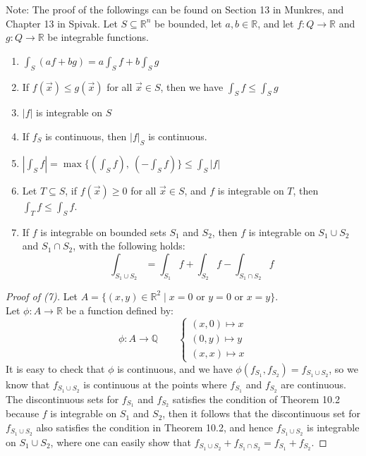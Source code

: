 \documentclass[15pt]{book}
\theoremstyle{break}
\theoremstyle{break}
\newcommand{\R}{\mathbb{R}}
\newcommand{\Q}{\mathbb{Q}}
\newcommand{\note}{\color{red}Note: \color{black}}
\begin{document}
\note The proof of the followings can be found on Section 13 in Munkres, and Chapter 13 in Spivak. Let $S\subseteq \R^n$ be bounded, let $a,b \in \R$, and let $f:Q \to \R$ and $g:Q \to \R$ be integrable functions.
\begin{enumerate}[topsep=3pt,itemsep=-1ex,partopsep=1ex,parsep=1ex]
\item $\int_S(af+bg) = a\int_S f + b\int_S g$
\item If $f(\vec{x})\leq g(\vec{x})$ for all $\vec{x}\in S$, then we have $\int_S f \leq \int_S g$
\item $|f|$ is integrable on $S$
\item If $f_S$ is continuous, then $|f|_S$ is continuous. 
\item $|\int_S f| = \max\{ (\int_S f),\ (- \int_S f)\} \leq \int_S |f|$
\item Let $T \subseteq S$, if $f(\vec{x}) \geq 0$ for all $\vec{x}\in S$,  and $f$ is integrable on $T$, then $\int_T f \leq \int_S f$. 
\item If $f$ is integrable on bounded sets $S_1$ and $S_2$, then $f$ is integrable on $S_1 \cup S_2$ and $S_1 \cap S_2$, with the following holds: $$\int_{S_1\cup S_2} = \int_{S_1} f + \int_{S_2} f - \int_{S_1\cap S_2} f$$
\end{enumerate}
\begin{proof}[Proof of (7)]
Let $A = \{ (x,y) \in \R^2 \mid x=0 \text{ or }y=0 \text{ or }x=y\}$. \\Let $\phi:A \to \R$ be a function defined by:
$$\phi:A \to \Q \qquad \begin{cases}(x,0) \mapsto x \\ (0,y) \mapsto y \\ (x,x) \mapsto x    \end{cases}$$
It is easy to check that $\phi$ is continuous, and we have $\phi(f_{S_1}, f_{S_2}) = f_{S_1\cup S_2}$, so we know that $f_{S_1\cup S_2} $ is continuous at the points where $f_{S_1}$ and $f_{S_2}$ are continuous. The discontinuous sets for $f_{S_1}$ and $f_{S_2}$ satisfies the condition of Theorem 10.2 because $f$ is integrable on $S_1$ and $S_2$, then it follows that the discontinuous set for $f_{S_1\cup S_2}$ also satisfies the condition in Theorem 10.2, and hence $f_{S_1\cup S_2}$ is integrable on $S_1 \cup S_2$, where one can easily show that $f_{S_1\cup S_2}+ f_{S_1\cap S_2} = f_{S_1} + f_{S_2}$. 
\end{proof}
\end{document}
